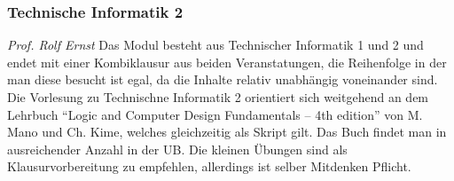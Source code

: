 \begin{multicols}{2}
\subsubsection{Technische Informatik 2}
	\textit{Prof. Rolf Ernst}
	Das Modul besteht aus Technischer Informatik 1 und 2 und endet
	mit einer Kombiklausur aus beiden Veranstatungen, die
	Reihenfolge in der man diese besucht ist egal, da die
	Inhalte relativ unabhängig voneinander sind.
	Die Vorlesung zu Technischne Informatik 2 orientiert sich weitgehend an dem Lehrbuch \enquote{Logic and Computer Design Fundamentals – 4th edition} von M. Mano und Ch. Kime, welches gleichzeitig als Skript gilt. Das Buch findet man in ausreichender Anzahl in der UB. Die kleinen Übungen sind als Klausurvorbereitung zu empfehlen, allerdings ist selber Mitdenken Pflicht.

\end{multicols}
